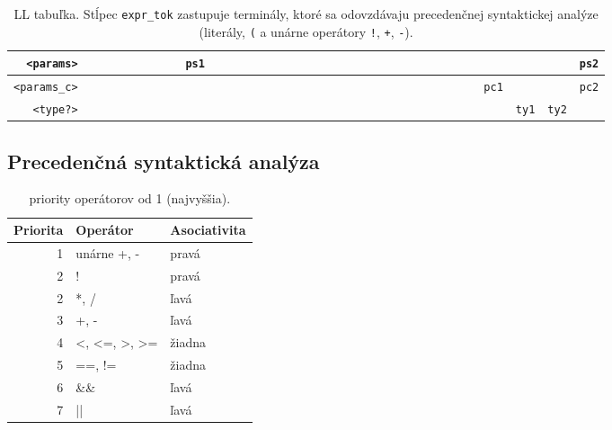 \documentclass[11pt,a4paper]{article}
\newcommand*\id[1]{\texttt{#1}}
\begin{document}
\begin{table}[H]
\begin{adjustbox}{width=\textwidth}
\begin{tabular}{|r||c|c|c|c|c|c|c|c|c|c|c|c|c|c|c|c|c|c|c|c|c|c|c|c|}
        \id{<params>}        & \id{   }                 & \id{   }    & \id{   }  & \id{   }  & \id{   }   & \id{ps1}   & \id{   }    & \id{   }  & \id{   }  & \id{   }     & \id{   } & \id{   }    & \id{   }  & \id{   }     & \id{   }   & \id{   } & \id{   } & \id{   }    & \id{   } & \id{   } & \id{   } & \id{   } & \id{   } & \id{ps2} \\ \hline
        \id{<params\_c>}     & \id{   }                 & \id{   }    & \id{   }  & \id{   }  & \id{   }   & \id{   }   & \id{   }    & \id{   }  & \id{   }  & \id{   }     & \id{   } & \id{   }    & \id{   }  & \id{   }     & \id{   }   & \id{   } & \id{   } & \id{   }    & \id{   } & \id{   } & \id{pc1} & \id{   } & \id{   } & \id{pc2} \\ \hline
        \id{<type?>}         & \id{   }                 & \id{   }    & \id{   }  & \id{   }  & \id{   }   & \id{   }   & \id{   }    & \id{   }  & \id{   }  & \id{   }     & \id{   } & \id{   }    & \id{   }  & \id{   }     & \id{   }   & \id{   } & \id{   } & \id{   }    & \id{   } & \id{   } & \id{   } & \id{ty1} & \id{ty2} & \id{   } \\ \hline
      \end{tabular}
    \end{adjustbox}
  \caption[LL tabuľka.]{LL tabuľka. Stĺpec \id{expr\_tok} zastupuje terminály, ktoré sa odovzdávaju precedenčnej syntaktickej analýze (literály, \id{(} a unárne operátory \id{!}, \id{+}, \id{-}).}
\end{table}

  \subsection{Precedenčná syntaktická analýza}

  \begin{table}[H]
    \centering
    \begin{tabular}{|r|l|l|}
      \hline
      Priorita & Operátor     & Asociativita \\ \hline
             1 & unárne +, -  & pravá        \\ \hline
             2 & !            & pravá        \\ \hline
             2 & *, /         & ľavá         \\ \hline
             3 & +, -         & ľavá         \\ \hline
             4 & <, <=, >, >= & žiadna       \\ \hline
             5 & ==, !=       & žiadna       \\ \hline
             6 & \&\&         & ľavá         \\ \hline
             7 & ||           & ľavá         \\ \hline
    \end{tabular}
    \caption{priority operátorov od 1 (najvyššia).}
  \end{table}
\end{document}
